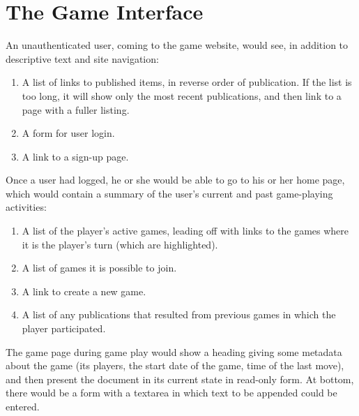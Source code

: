 \documentclass{manual}
\begin{document}
\section{The Game Interface}

An unauthenticated user, coming to the game website, would see, in
addition to descriptive text and site navigation:

\begin{enumerate}

\item A list of links to published items, in reverse order of
publication.  If the list is too long, it will show only the most
recent publications, and then link to a page with a fuller listing.
\item A form for user login.
\item A link to a sign-up page.

\end{enumerate}

Once a user had logged, he or she would be able to go to his or her
home page, which would contain a summary of the user's current and
past game-playing activities:

\begin{enumerate}

\item A list of the player's active games, leading off with links to
the games where it is the player's turn (which are highlighted). 

\item A list of games it is possible to join.

\item A link to create a new game.

\item A list of any publications that resulted from previous games in
which the player participated.

\end{enumerate}

The game page during game play would show a heading giving some
metadata about the game (its players, the start date of the game, time
of the last move), and then present the document in its current state
in read-only form.  At bottom, there would be a form with a textarea
in which text to be appended could be entered.

\end{document}
